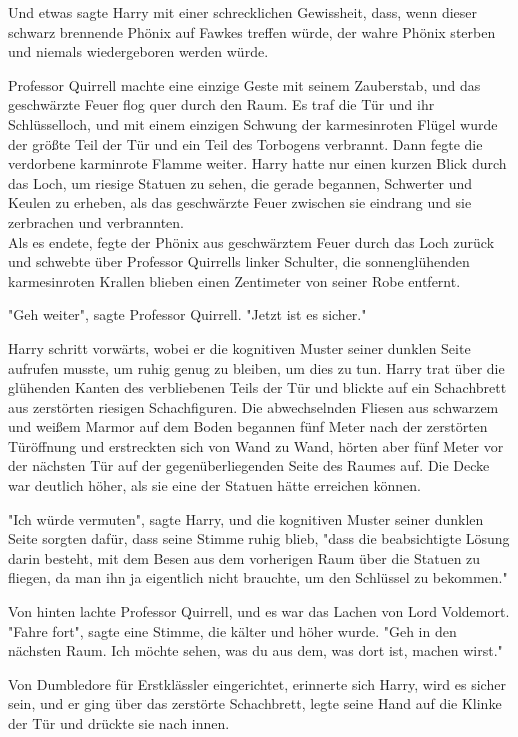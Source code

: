 {Und etwas sagte Harry mit einer schrecklichen Gewissheit, dass, wenn dieser schwarz brennende Phönix auf Fawkes treffen würde, der wahre Phönix sterben und niemals wiedergeboren werden würde.

Professor Quirrell machte eine einzige Geste mit seinem Zauberstab, und das geschwärzte Feuer flog quer durch den Raum. Es traf die Tür und ihr Schlüsselloch, und mit einem einzigen Schwung der karmesinroten Flügel wurde der größte Teil der Tür und ein Teil des Torbogens verbrannt. Dann fegte die verdorbene karminrote Flamme weiter. Harry hatte nur einen kurzen Blick durch das Loch, um riesige Statuen zu sehen, die gerade begannen, Schwerter und Keulen zu erheben, als das geschwärzte Feuer zwischen sie eindrang und sie zerbrachen und verbrannten.\\ Als es endete, fegte der Phönix aus geschwärztem Feuer durch das Loch zurück und schwebte über Professor Quirrells linker Schulter, die sonnenglühenden karmesinroten Krallen blieben einen Zentimeter von seiner Robe entfernt.

"Geh weiter", sagte Professor Quirrell. "Jetzt ist es sicher."

Harry schritt vorwärts, wobei er die kognitiven Muster seiner dunklen Seite aufrufen musste, um ruhig genug zu bleiben, um dies zu tun. Harry trat über die glühenden Kanten des verbliebenen Teils der Tür und blickte auf ein Schachbrett aus zerstörten riesigen Schachfiguren. Die abwechselnden Fliesen aus schwarzem und weißem Marmor auf dem Boden begannen fünf Meter nach der zerstörten Türöffnung und erstreckten sich von Wand zu Wand, hörten aber fünf Meter vor der nächsten Tür auf der gegenüberliegenden Seite des Raumes auf. Die Decke war deutlich höher, als sie eine der Statuen hätte erreichen können.

"Ich würde vermuten", sagte Harry, und die kognitiven Muster seiner dunklen Seite sorgten dafür, dass seine Stimme ruhig blieb, "dass die beabsichtigte Lösung darin besteht, mit dem Besen aus dem vorherigen Raum über die Statuen zu fliegen, da man ihn ja eigentlich nicht brauchte, um den Schlüssel zu bekommen."

Von hinten lachte Professor Quirrell, und es war das Lachen von Lord Voldemort.\\ "Fahre fort", sagte eine Stimme, die kälter und höher wurde. "Geh in den nächsten Raum. Ich möchte sehen, was du aus dem, was dort ist, machen wirst."

Von Dumbledore für Erstklässler eingerichtet, erinnerte sich Harry, wird es sicher sein, und er ging über das zerstörte Schachbrett, legte seine Hand auf die Klinke der Tür und drückte sie nach innen.

}
